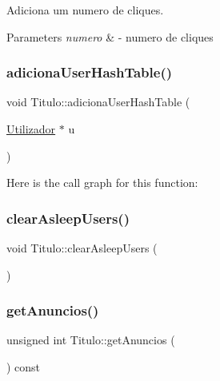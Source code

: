 Adiciona um numero de cliques. 


\begin{DoxyParams}{Parameters}
{\em numero} & -\/ numero de cliques \\
\hline
\end{DoxyParams}
\mbox{\label{class_titulo_a64300cd5c0c717f77666413127404d36}} 
\subsubsection{\texorpdfstring{adiciona\+User\+Hash\+Table()}{adicionaUserHashTable()}}
{\footnotesize\ttfamily void Titulo\+::adiciona\+User\+Hash\+Table (\begin{DoxyParamCaption}\item[{\mbox{\hyperlink{class_utilizador}{Utilizador}} $\ast$}]{u }\end{DoxyParamCaption})}

Here is the call graph for this function\+:
\mbox{\label{class_titulo_aa3c77caaee860b214308cf0d2944b835}} 
\subsubsection{\texorpdfstring{clear\+Asleep\+Users()}{clearAsleepUsers()}}
{\footnotesize\ttfamily void Titulo\+::clear\+Asleep\+Users (\begin{DoxyParamCaption}{ }\end{DoxyParamCaption})\hspace{0.3cm}{\ttfamily [inline]}}

\mbox{\label{class_titulo_ad36afe75694812eabe74af5fe32ad95b}} 
\subsubsection{\texorpdfstring{get\+Anuncios()}{getAnuncios()}}
{\footnotesize\ttfamily unsigned int Titulo\+::get\+Anuncios (\begin{DoxyParamCaption}{ }\end{DoxyParamCaption}) const}



